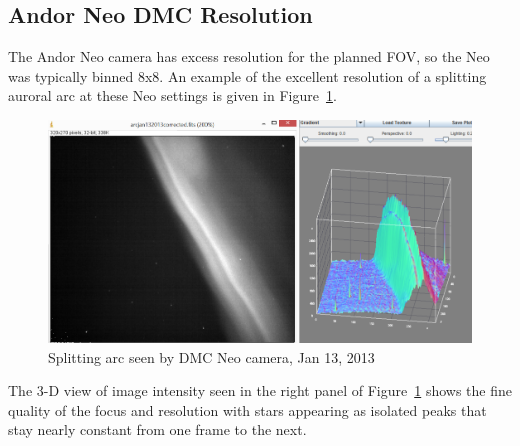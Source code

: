 \subsection{Andor Neo DMC Resolution}
The Andor Neo camera has excess resolution for the planned FOV, so the Neo was typically binned 8x8.
An example of the excellent resolution of a splitting auroral arc at these Neo settings is given in Figure~\ref{fig:neosplit}.
\begin{figure}
	\includegraphics[trim=0 0 50 40,clip,width=\linewidth]{gfx/2013-01-13gradient}
	\caption{Splitting arc seen by DMC Neo camera, Jan 13, 2013}\label{fig:neosplit}
\end{figure}
The 3-D view of image intensity seen in the right panel of Figure~\ref{fig:neosplit} shows the fine quality of the focus and resolution with stars appearing as isolated peaks that stay nearly constant from one frame to the next.
